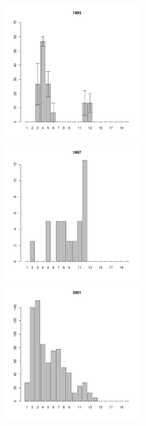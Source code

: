 \documentclass[12pt, a4paper]{article}
\begin{document}
\begin{figure}[h]
\begin{multicols}{3}
\hfill
\includegraphics[width=60mm]{../White_Sea/Luvenga_Goreliy/high_1993_.pdf}
\hfill
\includegraphics[width=60mm]{../White_Sea/Luvenga_Goreliy/high_1997_.pdf}
\hfill
\includegraphics[width=60mm]{../White_Sea/Luvenga_Goreliy/high_2001_.pdf}
\end{multicols}



\end{figure}
\end{document}
